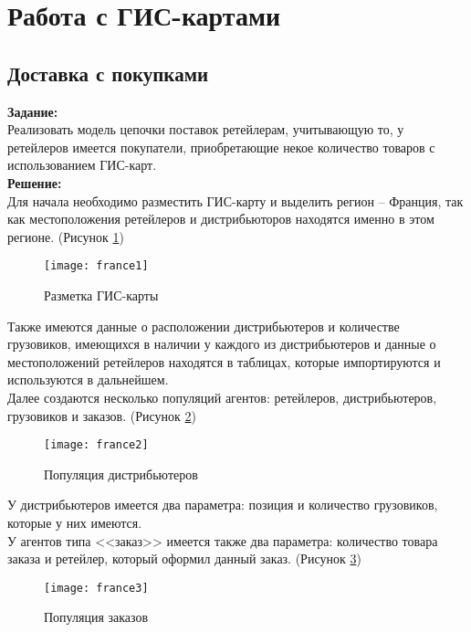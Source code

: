 \section*{Работа с ГИС-картами}
\subsection*{Доставка с покупками}

\textbf{Задание:}\\
Реализовать модель цепочки поставок ретейлерам, учитывающую то, у ретейлеров имеется покупатели, приобретающие некое количество товаров с использованием ГИС-карт.\\

\textbf{Решение:}\\
Для начала необходимо разместить ГИС-карту и выделить регион -- Франция, так как местоположения ретейлеров и дистрибьюторов находятся именно в этом регионе. (Рисунок \ref{fig:france1})
\begin{figure}[h]
	\centering \texttt{[image: france1]}
	\caption{Разметка ГИС-карты}
	\label{fig:france1}
\end{figure}

Также имеются данные о расположении дистрибьютеров и количестве грузовиков, имеющихся в наличии у каждого из дистрибьютеров и данные о местоположений ретейлеров находятся в таблицах, которые импортируются и используются в дальнейшем.\\

Далее создаются несколько популяций агентов: ретейлеров, дистрибьютеров, грузовиков и заказов. (Рисунок \ref{fig:france2})
\begin{figure}[h]
	\centering \texttt{[image: france2]}
	\caption{Популяция дистрибьютеров}
	\label{fig:france2}
\end{figure}

\newpage

У дистрибьютеров имеется два параметра: позиция и количество грузовиков, которые у них имеются.\\

У агентов типа <<заказ>> имеется также два параметра: количество товара заказа и ретейлер, который оформил данный заказ. (Рисунок \ref{fig:france3})
\begin{figure}[h]
	\centering \texttt{[image: france3]}
	\caption{Популяция заказов}
	\label{fig:france3}
\end{figure}

